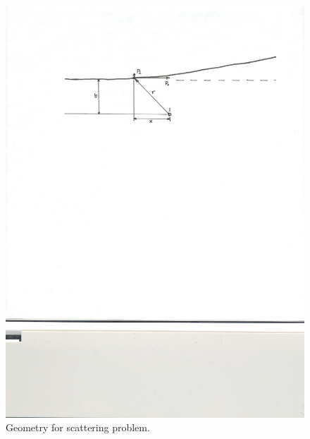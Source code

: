 \begin{figure}[htbp]
\includegraphics[width=\textwidth]{scattering}
\caption{Geometry for scattering problem.}
\label{f.scattering}
\end{figure}

